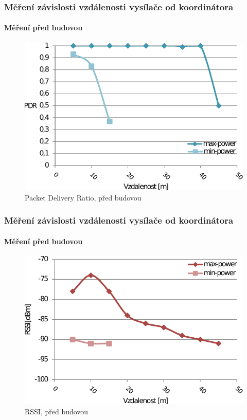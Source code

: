 \documentclass{beamer}
\begin{document}
	\begin{frame}
	\frametitle{Měření závislosti vzdálenosti vysílače od koordinátora}
	\framesubtitle{Měření před budovou}
	\begin{figure}[!ht]
	\centering%
	\includegraphics[scale=0.7, keepaspectratio]{2-pdr-venku}%
	\caption{Packet Delivery Ratio, před budovou}
	\end{figure}
	\end{frame}

	\begin{frame}
	\frametitle{Měření závislosti vzdálenosti vysílače od koordinátora}
	\framesubtitle{Měření před budovou}
	\begin{figure}[!ht]
	\centering%
	\includegraphics[scale=0.7, keepaspectratio]{2-rssi-venku}%
	\caption{RSSI, před budovou}
	\end{figure}
	\end{frame}
\end{document}
